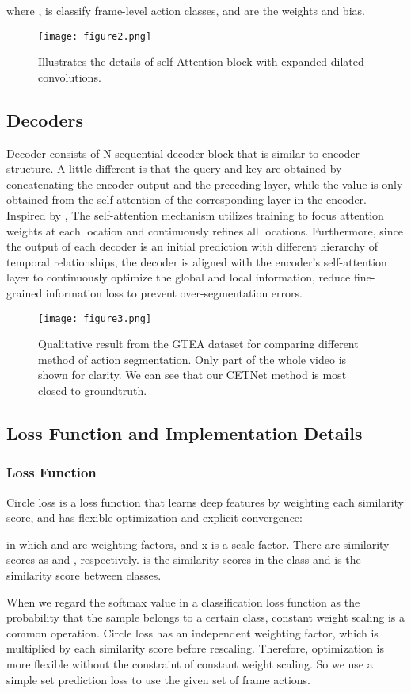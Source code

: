 \documentclass[runningheads]{llncs}
\begin{document}
\noindent where ,  is classify frame-level action classes,  and  are the weights and bias.
\begin{figure}
	\centering
	\texttt{[image: figure2.png]}
	\caption{Illustrates the details of self-Attention block with expanded dilated convolutions.}
	\label{FIG2}
\end{figure}
\subsection{Decoders}\label{section3.3}
\par{
	Decoder consists of N sequential decoder block that is similar to encoder structure. A little different is that the query  and key  are obtained by concatenating the encoder output and the preceding layer, while the value  is only obtained from the self-attention of the corresponding layer in the encoder. Inspired by \cite{yi2021asformer}, The self-attention mechanism utilizes training to focus attention weights at each location and continuously refines all locations. Furthermore, since the output of each decoder is an initial prediction with different hierarchy of temporal relationships, the decoder is aligned with the encoder's self-attention layer to continuously optimize the global and local information, reduce fine-grained information loss to prevent over-segmentation errors.
}
\begin{figure*}
	\centering
	\texttt{[image: figure3.png]}
	\caption{Qualitative result from the GTEA dataset for comparing different method of action segmentation. Only part of the whole video is shown for clarity. We can see that our CETNet method is most closed to groundtruth.}
	\label{FIG3}
\end{figure*}
\subsection{Loss Function and Implementation Details}\label{section3.4}
\subsubsection{Loss Function}
\par{
	Circle loss \cite{sun2020circle} is a loss function that learns deep features by weighting each similarity score, and has flexible optimization and explicit convergence:
}

\noindent in which  and  are weighting factors, and x is a scale factor. There are similarity scores as  and , respectively.  is the similarity scores in the class and  is the similarity score between classes. 
\par{
	When we regard the softmax value in a classification loss function as the probability that the sample belongs to a certain class, constant weight scaling is a common operation. Circle loss has an independent weighting factor, which is multiplied by each similarity score before rescaling. Therefore, optimization is more flexible without the constraint of constant weight scaling. So we use a simple set prediction loss  to use the given set of frame actions.
}
\end{document}
